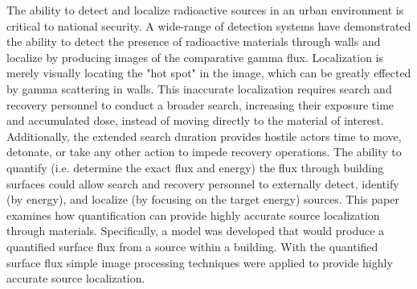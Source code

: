 The ability to detect and localize radioactive sources in an urban environment is critical to national security. A wide-range of detection systems have demonstrated the ability to detect the presence of radioactive materials through walls and localize by producing images of the comparative gamma flux. Localization is merely visually locating the "hot spot" in the image, which can be greatly effected by gamma scattering in walls. This inaccurate localization requires search and recovery personnel to conduct a broader search, increasing their exposure time and accumulated dose, instead of moving directly to the material of interest. Additionally, the extended search duration provides hostile actors time to move, detonate, or take any other action to impede recovery operations. The ability to quantify (i.e. determine the exact flux and energy) the flux through building surfaces could allow search and recovery personnel to externally detect, identify (by energy), and localize (by focusing on the target energy) sources. This paper examines how quantification can provide highly accurate source localization through materials. Specifically, a model was developed that would produce a quantified surface flux from a source within a building. With the quantified surface flux simple image processing techniques were applied to provide highly accurate source localization.
